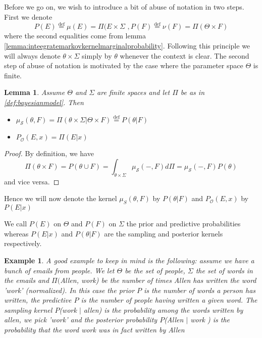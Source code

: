 \documentclass{book}
\theoremstyle{plain}
\newtheorem{example}[corollary]{Example}
\newtheorem{lemma}[corollary]{Lemma}
\theoremstyle{definition}
\newcommand{\define}{\stackrel{\operatorname{def}}{=}}
\renewcommand{\r}[1]{\mathcal{#1}}
\begin{document}
Before we go on, we wish to introduce a bit of abuse of notation in two steps. First we denote
\[
P(E)\define \mu(E)=\Pi(E\times \Sigma \,\,, P(F)\define \nu(F)=\Pi(\Theta\times F)
\]
where the second equalities come from lemma \ref{lemma:inteegratemarkovkernelmarginalprobability}. Following this principle we will always denote $\theta \times \Sigma$ simply by $\theta$ whenever the context is clear.
The second step of abuse of notation is motivated by the case where the parameter space $\Theta$ is finite.\\

\begin{lemma}
Assume $\Theta$ and $\Sigma$ are finite spaces and let $\Pi$ be as in \ref{def:bayesianmodel}. Then
\begin{itemize}
\item $\mu_\r{S}(\theta,F)=\Pi(\theta\times \Sigma \vert \Theta\times F)\define P(\theta\vert F)$
\item $P_\r{O}(E,x)=\Pi(E\vert x)$
\end{itemize}
\end{lemma}

\begin{proof}
By definition, we have
\[
\Pi(\theta \times F)=P(\theta\cup F)=\int_{\theta\times \Sigma} \mu_\r{S}(-,F)d\Pi=\mu_\r{S}(-,F)P(\theta)
\]
and vice versa.	
\end{proof}

Hence we will now denote the kernel $\mu_{S}(\theta , F)$ by $P(\theta \vert F)$ and $P_\r{O}(E,x)$ by $P(E\vert x)$

We call $P(E)$ on $\Theta$ and $P(F)$ on $\Sigma$ the prior and predictive probabilities whereas $P(E\vert x)$ and $P(\theta\vert F)$ are the sampling and posterior kernels respectively.

\begin{example}
A good example to keep in mind is the following: assume we have a bunch of emails from people. We let $\Theta$ be the set of people, $\Sigma$ the set of words in the emails and $\Pi($Allen, work) be the number of times Allen has written the word 'work' (normalized). In this case the prior  $P$ is the number of words a person has written, the predictive $P$  is the number of people having written a given word. The sampling kernel $P$(work $\vert$ allen) is the probability among the words written by allen, we pick 'work' and the posterior probability $P$(Allen $\vert$ work ) is the probability that the word work was in fact written by Allen
\end{example}
 
\end{document}
